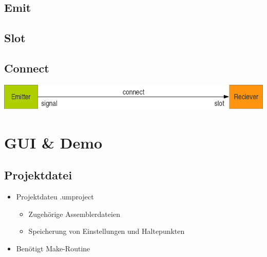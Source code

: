 \begin{frame}[fragile]{\insertsubsection}
	
\end{frame}

\subsection{Emit}

\begin{frame}[fragile]{\insertsubsection}
	
\end{frame}

\subsection{Slot}

\begin{frame}[fragile]{\insertsubsection}
	
\end{frame}

\subsection{Connect}

\begin{frame}[fragile]{\insertsubsection}
	\includegraphics[width=\textwidth]{g4}
	
	
\end{frame}

\section{GUI \& Demo}

\subsection{Projektdatei}

\begin{frame}{\insertsubsection}
    \begin{itemize}
         \item Projektdateu .umproject
         \begin{itemize}
         	\item Zugehörige Assemblerdateien
			\item Speicherung von Einstellungen und Haltepunkten
    	 \end{itemize}
         \item Benötigt Make-Routine
    \end{itemize}
\end{frame}

